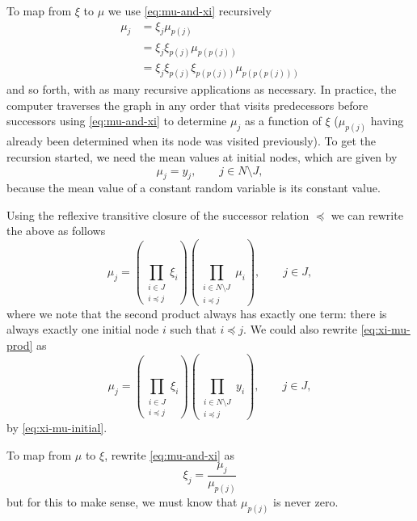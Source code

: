To map from $\xi$ to $\mu$ we use \eqref{eq:mu-and-xi} recursively
\begin{align*}
   \mu_j
   & =
   \xi_j \mu_{p(j)}
   \\
   & =
   \xi_j \xi_{p(j)} \mu_{p(p(j))}
   \\
   & =
   \xi_j \xi_{p(j)} \xi_{p(p(j))} \mu_{p(p(p(j)))}
\end{align*}
and so forth, with as many recursive applications as necessary.  In practice,
the computer traverses the graph in any order that visits predecessors before
successors using \eqref{eq:mu-and-xi} to determine $\mu_j$ as a function of
$\xi$ ($\mu_{p(j)}$ having already been determined when its node was visited
previously).  To get the recursion started, we need the mean values at initial
nodes, which are given by
\begin{equation} \label{eq:xi-mu-initial}
   \mu_j = y_j, \qquad j \in N \setminus J,
\end{equation}
because the mean value of a constant random variable is its constant value.

Using the reflexive transitive closure of the successor relation $\preceq$
we can rewrite the above as follows
\begin{equation} \label{eq:xi-mu-prod}
    \mu_j
    =
    \left( \prod_{\substack{i \in J \\ i \preceq j}} \xi_i \right)
    \left( \prod_{\substack{i \in N \setminus J \\ i \preceq j}} \mu_i \right),
    \qquad j \in J,
\end{equation}
where we note that the second product always has exactly one term: there
is always exactly one initial node $i$ such that $i \preceq j$.
We could also rewrite \eqref{eq:xi-mu-prod} as
\begin{equation} \label{eq:xi-mu-prod-too}
    \mu_j
    =
    \left( \prod_{\substack{i \in J \\ i \preceq j}} \xi_i \right)
    \left( \prod_{\substack{i \in N \setminus J \\ i \preceq j}} y_i \right),
    \qquad j \in J,
\end{equation}
by \eqref{eq:xi-mu-initial}.

To map from $\mu$ to $\xi$, rewrite \eqref{eq:mu-and-xi} as
\begin{equation} \label{eq:mu-to-xi}
   \xi_j = \frac{\mu_j}{\mu_{p(j)}}
\end{equation}
but for this to make sense, we must know that $\mu_{p(j)}$ is never zero.

